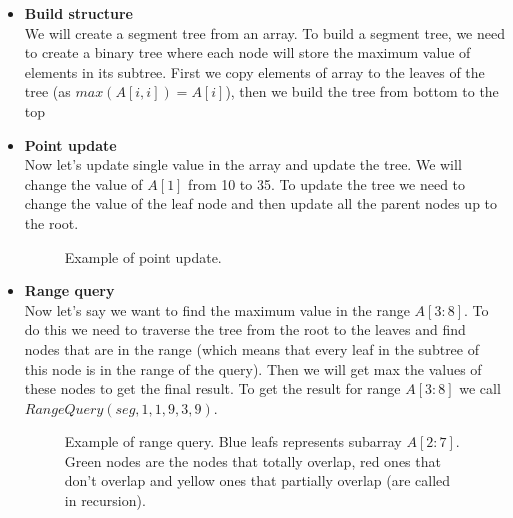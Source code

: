 \documentclass{article}
\begin{document}
\begin{itemize}
    \item \textbf{Build structure} \\
    We will create a segment tree from an array.
    To build a segment tree, we need to create a binary tree where each node will store the maximum value of elements in its subtree.
    First we copy elements of array to the leaves of the tree (as \(max(A[i, i]) = A[i]\)), then we build the tree from bottom to the top \\
    
    \FloatBarrier
    \item \textbf{Point update} \\
    Now let's update single value in the array and update the tree.
    We will change the value of \(A[1]\) from 10 to 35.
    To update the tree we need to change the value of the leaf node 
    and then update all the parent nodes up to the root.
    
    \begin{figure}[H]
        \centering
        
        \caption{Example of point update.}
        \label{fig:segment_tree_2}
    \end{figure}

    \item \textbf{Range query} \\
    Now let's say we want to find the maximum value in the range \(A[3:8]\).
    To do this we need to traverse the tree from the root to the leaves and 
    find nodes that are in the range (which means that every leaf in the subtree of this node is in the range of the query). 
    Then we will get max the values of these nodes to get the final result.
    To get the result for range \(A[3:8]\) we call \(RangeQuery(seg, 1, 1, 9, 3, 9)\).

    

    \begin{figure}[H]
        \centering
        
        \caption{Example of range query. Blue leafs represents subarray \(A[2:7]\). Green nodes 
        are the nodes that totally overlap, red ones that don't overlap and yellow ones that partially overlap (are called in recursion).}
        \label{fig:segment_tree_3}
    \end{figure}

\end{itemize}
\end{document}
